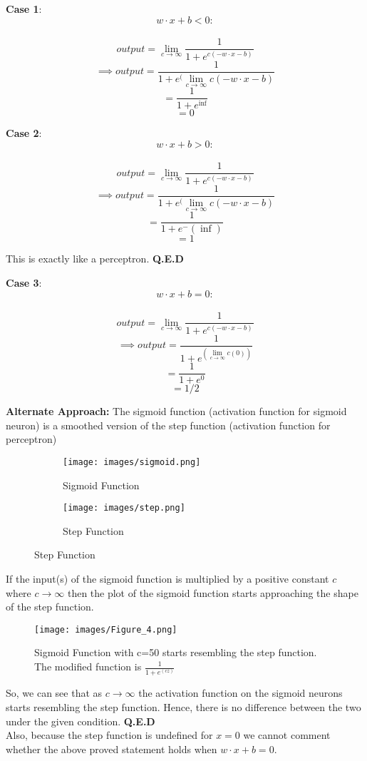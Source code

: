 \documentclass[18pt]{article}
\begin{document}
\textbf{Case 1}:$$w \cdot x + b < 0:$$\\
$$output=\lim_{c \rightarrow \infty} \frac{1}{1 + e^{c(-w\cdot x-b)}}$$
$$\implies output=\frac{1}{1+e^(\lim_{c \rightarrow \infty}c(-w\cdot x-b)}$$
$$=\frac{1}{1+e^\inf}$$
$$=0$$

\textbf{Case 2}:$$w \cdot x + b > 0:$$\\
$$output=\lim_{c \rightarrow \infty} \frac{1}{1 + e^{c(-w\cdot x-b)}}$$
$$\implies output=\frac{1}{1+e^(\lim_{c \rightarrow \infty}c(-w\cdot x-b)}$$
$$=\frac{1}{1+e^-(\inf)}$$
$$=1$$

This is exactly like a perceptron. \textbf{Q.E.D}

\textbf{Case 3}:$$w \cdot x + b = 0:$$\\
$$output=\lim_{c \rightarrow \infty} \frac{1}{1 + e^{c(-w\cdot x-b)}}$$
$$\implies output=\frac{1}{1+e^(\lim_{c \rightarrow \infty}c(0))}$$
$$=\frac{1}{1+e^0}$$
$$=1/2$$

\textbf{Alternate Approach:}
The sigmoid function (activation function for sigmoid neuron) is a smoothed version of the step function (activation function for perceptron)
\begin{figure}[htbp]
  \centering
  \begin{subfigure}[b]{0.4\textwidth}
    \texttt{[image: images/sigmoid.png]}
    \caption{Sigmoid Function}
    \label{fig:sigmoid}
  \end{subfigure}
  \hspace{1cm}
  \begin{subfigure}[b]{0.4\textwidth}
    \texttt{[image: images/step.png]}
    \caption{Step Function}
    \label{fig:step}
  \end{subfigure}
\end{figure}

If the input(s) of the sigmoid function is multiplied by a positive constant $c$ where $c\rightarrow \infty$ then the plot of the sigmoid function starts approaching the shape of the step function.


\begin{figure}[htbp]
    \centering
    \texttt{[image: images/Figure\_4.png]}
    \caption{Sigmoid Function with c=50 starts resembling the step function. The modified function is $\frac{1}{1+e^(cz)}$}
    \label{fig:my_label}
\end{figure}

So, we can see that as $c \rightarrow \infty$ the activation function on the sigmoid neurons starts resembling the step function. Hence, there is no difference between the two under the given condition. \textbf{Q.E.D}\\
Also, because the step function is undefined for $x=0$ we cannot comment whether the above proved statement holds when $w\cdot x + b = 0$.
\\
\end{document}
